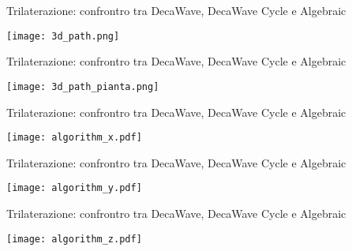 \begin{frame}{Trilaterazione: confrontro tra DecaWave, DecaWave Cycle e Algebraic}
  \begin{center}
    \texttt{[image: 3d\_path.png]}
  \end{center}
\end{frame}

\begin{frame}{Trilaterazione: confrontro tra DecaWave, DecaWave Cycle e Algebraic}
  \begin{center}
    \texttt{[image: 3d\_path\_pianta.png]}
  \end{center}
\end{frame}

\begin{frame}{Trilaterazione: confrontro tra DecaWave, DecaWave Cycle e Algebraic}
  \begin{center}
    \texttt{[image: algorithm\_x.pdf]}
  \end{center}
\end{frame}

\begin{frame}{Trilaterazione: confrontro tra DecaWave, DecaWave Cycle e Algebraic}
  \begin{center}
    \texttt{[image: algorithm\_y.pdf]}
  \end{center}
\end{frame}

\begin{frame}{Trilaterazione: confrontro tra DecaWave, DecaWave Cycle e Algebraic}
  \begin{center}
    \texttt{[image: algorithm\_z.pdf]}
  \end{center}
\end{frame}


